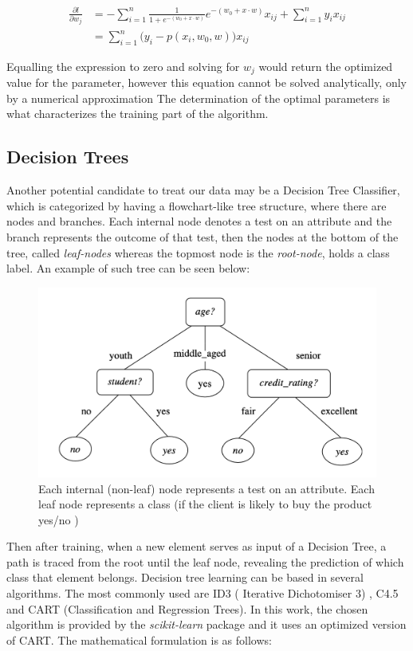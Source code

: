 \begin{align}
\frac{\partial l}{\partial w_j} & = -  \sum_{i=1}^{n} \frac{1}{1 + e^{-(w_0 + x \cdot w )}}e^{-(w_0 + x \cdot w )}x_{ij} +   \sum_{i=1}^{n} y_i x_{ij} \\
 & = \sum_{i=1}^{n} \bigg( y_i - p(x_i,w_0,w) \bigg)x_{ij}
\end{align}

Equalling the expression to zero and solving for $w_j$ would return the optimized value for the parameter, however this equation cannot be solved analytically, only by a numerical approximation \cite{shalizi}  The determination of the optimal parameters is what characterizes the training part of the algorithm. 


\subsection{Decision Trees}

Another potential candidate to treat our data may be a Decision Tree Classifier, which is categorized by having a flowchart-like tree structure, where there are nodes and branches. Each internal node denotes a test on an attribute and the branch represents the outcome of that test, then the nodes at the bottom of the tree, called \textit{leaf-nodes} whereas the topmost node is the \textit{root-node}, holds a class label. An example of such tree can be seen below\cite{HanDataMining}:

\begin{figure}[H]
	\centering
	\includegraphics[scale=0.5, width=0.6\linewidth]{figures/DecisionTreeDiagram.png}
	\caption{Each internal (non-leaf) node represents a test on an attribute. Each leaf node represents a class (if the client is likely to buy the product yes/no )}
	\label{DTDiagram}
\end{figure} 

Then after training, when a new element serves as input of a Decision Tree, a path is traced from the root until the leaf node, revealing the prediction of which class that element belongs. Decision tree learning can be based in several algorithms. The most commonly used are ID3 ( Iterative Dichotomiser 3) , C4.5 and CART (Classification and Regression Trees). In this work, the chosen algorithm is provided by the \textit{scikit-learn} package and it uses an optimized version of CART. The mathematical formulation is as follows: 

